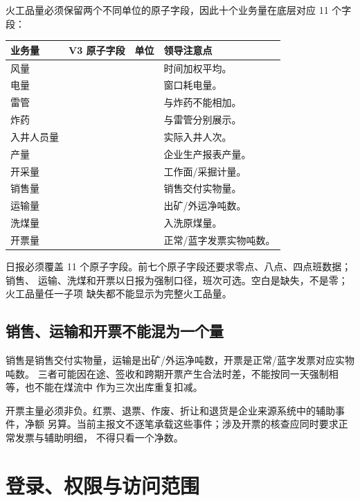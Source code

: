 \documentclass[UTF8,openany,zihao=-4,fontset=none]{ctexbook}
\begin{document}
火工品量必须保留两个不同单位的原子字段，因此十个业务量在底层对应 11 个字段：

\begin{longtable}{P{33mm}P{50mm}P{20mm}P{43mm}}
\toprule
\textbf{业务量} & \textbf{V3 原子字段} & \textbf{单位} & \textbf{领导注意点}\\
\midrule
风量 &  &  & 时间加权平均。\\
电量 &  &  & 窗口耗电量。\\
雷管 &  &  & 与炸药不能相加。\\
炸药 &  &  & 与雷管分别展示。\\
入井人员量 &  &  & 实际入井人次。\\
产量 &  &  & 企业生产报表产量。\\
开采量 &  &  & 工作面/采掘计量。\\
销售量 &  &  & 销售交付实物量。\\
运输量 &  &  & 出矿/外运净吨数。\\
洗煤量 &  &  & 入洗原煤量。\\
开票量 &  &  & 正常/蓝字发票实物吨数。\\
\bottomrule
\end{longtable}

日报必须覆盖 11 个原子字段。前七个原子字段还要求零点、八点、四点班数据；销售、
运输、洗煤和开票以日报为强制口径，班次可选。空白是缺失，不是零；火工品量任一子项
缺失都不能显示为完整火工品量。

\section{销售、运输和开票不能混为一个量}

销售是销售交付实物量，运输是出矿/外运净吨数，开票是正常/蓝字发票对应实物吨数。
三者可能因在途、签收和跨期开票产生合法时差，不能按同一天强制相等，也不能在煤流中
作为三次出库重复扣减。

开票主量必须非负。红票、退票、作废、折让和退货是企业来源系统中的辅助事件，净额
另算。当前主报文不逐笔承载这些事件；涉及开票的核查应同时要求正常发票与辅助明细，
不得只看一个净数。

\chapter{登录、权限与访问范围}
\end{document}
